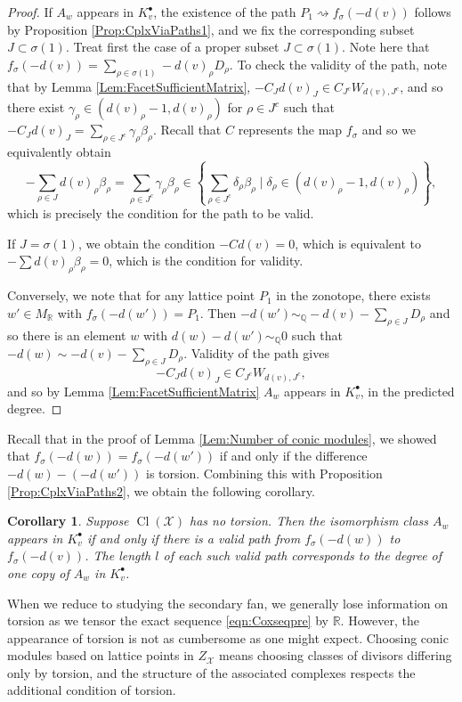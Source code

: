 \documentclass[reqno, 12pt]{amsart}
\newtheorem{corollary}[theorem]{Corollary}
\theoremstyle{definition}
\numberwithin{equation}{section}
\newcommand{\R}{\mathbb{R}}
\newcommand{\Q}{\mathbb{Q}}
\begin{document}
\begin{proof}
If $A_w$ appears in $K_v^\bullet$, the existence of the path $P_1\rightsquigarrow f_\sigma(-d(v))$ follows by Proposition \ref{Prop:CplxViaPaths1}, and we fix the corresponding subset $J\subset \sigma(1)$. Treat first the case of a proper subset $J\subset\sigma(1)$. Note here that $f_\sigma(-d(v))=\sum_{\rho\in \sigma(1)}-d(v)_\rho D_\rho$.
To check the validity of the path, note that by Lemma \ref{Lem:FacetSufficientMatrix}, $-C_Jd(v)_{J}\in C_{J^c}W_{d(v),J^c}$, and so there exist $\gamma_\rho\in (d(v)_\rho-1,d(v)_\rho)$ for $\rho \in J^c$ such that $-C_Jd(v)_J=\sum_{\rho\in J^c}\gamma_\rho\beta_\rho$.
Recall that $C$ represents the map $f_{\sigma}$ and so we equivalently obtain \[
-\sum_{\rho\in J}d(v)_\rho\beta_\rho=\sum_{\rho\in J^c}\gamma_\rho\beta_\rho\in \left\{\sum_{\rho\in J^c}\delta_\rho\beta_\rho\mid \delta_\rho\in (d(v)_\rho-1,d(v)_\rho)\right\},
\]
which is precisely the condition for the path to be valid.

If $J=\sigma(1)$, we obtain the condition $-Cd(v)=0$, which is equivalent to $-\sum d(v)_\rho\beta_\rho=0$, which is the condition for validity.

Conversely, we note that for any lattice point $P_1$ in the zonotope, there exists $w'\in M_\R$ with $f_\sigma(-d(w'))=P_1$. Then $-d(w')\sim_\Q-d(v)-\sum_{\rho\in J}D_\rho$ and so there is an element $w$ with $d(w)-d(w')\sim_\Q 0$ such that $-d(w)\sim -d(v)-\sum_{\rho\in J}D_\rho$. Validity of the path gives 
\[
-C_Jd(v)_J\in C_{J^c}W_{d(v),J^c},
\]
and so by Lemma \ref{Lem:FacetSufficientMatrix} $A_w$ appears in $K_v^\bullet$, in the predicted degree. 
\end{proof}

Recall that in the proof of Lemma \ref{Lem:Number of conic modules}, we showed that $f_\sigma(-d(w))=f_\sigma(-d(w'))$ if and only if the difference $-d(w)-(-d(w'))$ is torsion. Combining this with Proposition \ref{Prop:CplxViaPaths2}, we obtain the following corollary.

\begin{corollary}
    \label{Cor:NoTorsionSym}
    Suppose $\operatorname{Cl}(\mathcal{X})$ has no torsion. Then the isomorphism class $A_w$ appears in $K_v^\bullet$ if and only if there is a valid path from $f_\sigma(-d(w))$ to $f_\sigma(-d(v))$. The length $l$ of each such valid path corresponds to the degree of one copy of $A_w$ in $K_v^\bullet$.
\end{corollary}

When we reduce to studying the secondary fan, we generally lose information on torsion as we tensor the exact sequence \eqref{eqn:Coxseqpre} by $\R$. However, the appearance of torsion is not as cumbersome as one might expect. Choosing conic modules based on lattice points in $Z_{\mathcal{X}}$ means choosing classes of divisors differing only by torsion, and the structure of the associated complexes respects the additional condition of torsion.
\end{document}
